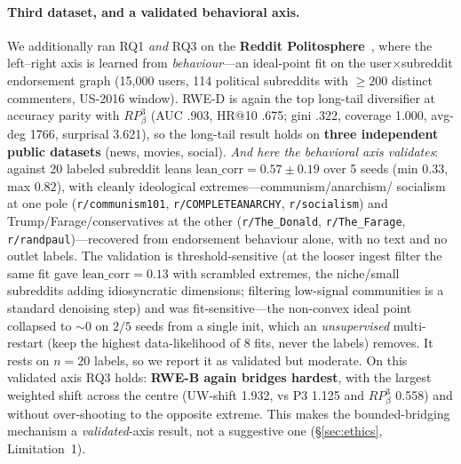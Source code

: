 \documentclass[sigconf,nonacm]{acmart}
\begin{document}
\paragraph{Third dataset, and a validated behavioral axis.} We additionally ran
RQ1 \emph{and} RQ3 on the \textbf{Reddit Politosphere}~\cite{politosphere2022}, where
the left--right axis is learned from \emph{behaviour}---an ideal-point fit on the
user$\times$subreddit endorsement graph (15{,}000 users, 114 political subreddits
with $\ge200$ distinct commenters, US-2016 window). RWE-D is again the top long-tail
diversifier at accuracy parity with $RP^3_\beta$ (AUC .903, HR@10 .675; gini .322,
coverage 1.000, avg-deg 1766, surprisal 3.621), so the long-tail result holds on
\textbf{three independent public datasets} (news, movies, social). \emph{And here the
behavioral axis validates}: against 20 labeled subreddit leans
$\mathrm{lean\_corr}=0.57\pm0.19$ over 5 seeds (min $0.33$, max $0.82$), with cleanly
ideological extremes---communism/anarchism/
socialism at one pole (\texttt{r/communism101}, \texttt{r/COMPLETEANARCHY},
\texttt{r/socialism}) and Trump/Farage/conservatives at the other
(\texttt{r/The\_Donald}, \texttt{r/The\_Farage}, \texttt{r/randpaul})---recovered from
endorsement behaviour alone, with no text and no outlet labels. The validation is
threshold-sensitive (at the looser ingest filter the same fit gave
$\mathrm{lean\_corr}=0.13$ with scrambled extremes, the niche/small subreddits adding
idiosyncratic dimensions; filtering low-signal communities is a standard denoising
step) and was fit-sensitive---the non-convex ideal point collapsed to $\sim0$ on $2/5$
seeds from a single init, which an \emph{unsupervised} multi-restart (keep the
highest data-likelihood of 8 fits, never the labels) removes. It rests on $n{=}20$
labels, so we report it as validated but moderate. On this validated axis RQ3 holds: \textbf{RWE-B again bridges
hardest}, with the largest weighted shift across the centre (UW-shift 1.932, vs P3
1.125 and $RP^3_\beta$ 0.558) and without over-shooting to the opposite extreme.
This makes the bounded-bridging mechanism a \emph{validated}-axis result, not a
suggestive one (\S\ref{sec:ethics}, Limitation~1).
\end{document}
